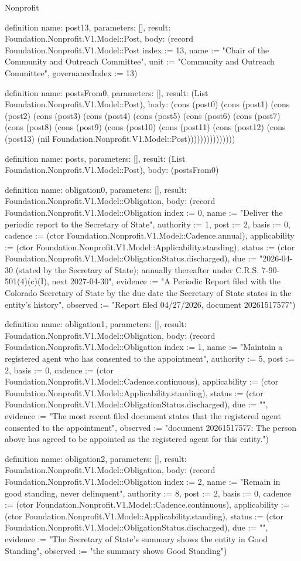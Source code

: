 \begin{lexlean}{Nonprofit}
\begin{semanticmodule}
definition{
  name: post13,
  parameters: [],
  result: Foundation.Nonprofit.V1.Model::Post,
  body: (record Foundation.Nonprofit.V1.Model::Post {index := 13, name := "Chair of the Community and Outreach Committee", unit := "Community and Outreach Committee", governanceIndex := 13})
}

definition{
  name: postsFrom0,
  parameters: [],
  result: (List Foundation.Nonprofit.V1.Model::Post),
  body: (cons (post0) (cons (post1) (cons (post2) (cons (post3) (cons (post4) (cons (post5) (cons (post6) (cons (post7) (cons (post8) (cons (post9) (cons (post10) (cons (post11) (cons (post12) (cons (post13) (nil Foundation.Nonprofit.V1.Model::Post)))))))))))))))
}

definition{
  name: posts,
  parameters: [],
  result: (List Foundation.Nonprofit.V1.Model::Post),
  body: (postsFrom0)
}

definition{
  name: obligation0,
  parameters: [],
  result: Foundation.Nonprofit.V1.Model::Obligation,
  body: (record Foundation.Nonprofit.V1.Model::Obligation {index := 0, name := "Deliver the periodic report to the Secretary of State", authority := 1, post := 2, basis := 0, cadence := (ctor Foundation.Nonprofit.V1.Model::Cadence.annual), applicability := (ctor Foundation.Nonprofit.V1.Model::Applicability.standing), status := (ctor Foundation.Nonprofit.V1.Model::ObligationStatus.discharged), due := "2026-04-30 (stated by the Secretary of State); annually thereafter under C.R.S. 7-90-501(4)(c)(I), next 2027-04-30", evidence := "A Periodic Report filed with the Colorado Secretary of State by the due date the Secretary of State states in the entity's history", observed := "Report filed 04/27/2026, document 20261517577"})
}

definition{
  name: obligation1,
  parameters: [],
  result: Foundation.Nonprofit.V1.Model::Obligation,
  body: (record Foundation.Nonprofit.V1.Model::Obligation {index := 1, name := "Maintain a registered agent who has consented to the appointment", authority := 5, post := 2, basis := 0, cadence := (ctor Foundation.Nonprofit.V1.Model::Cadence.continuous), applicability := (ctor Foundation.Nonprofit.V1.Model::Applicability.standing), status := (ctor Foundation.Nonprofit.V1.Model::ObligationStatus.discharged), due := "", evidence := "The most recent filed document states that the registered agent consented to the appointment", observed := "document 20261517577: The person above has agreed to be appointed as the registered agent for this entity."})
}

definition{
  name: obligation2,
  parameters: [],
  result: Foundation.Nonprofit.V1.Model::Obligation,
  body: (record Foundation.Nonprofit.V1.Model::Obligation {index := 2, name := "Remain in good standing, never delinquent", authority := 8, post := 2, basis := 0, cadence := (ctor Foundation.Nonprofit.V1.Model::Cadence.continuous), applicability := (ctor Foundation.Nonprofit.V1.Model::Applicability.standing), status := (ctor Foundation.Nonprofit.V1.Model::ObligationStatus.discharged), due := "", evidence := "The Secretary of State's summary shows the entity in Good Standing", observed := "the summary shows Good Standing"})
}


\end{semanticmodule}
\end{lexlean}
